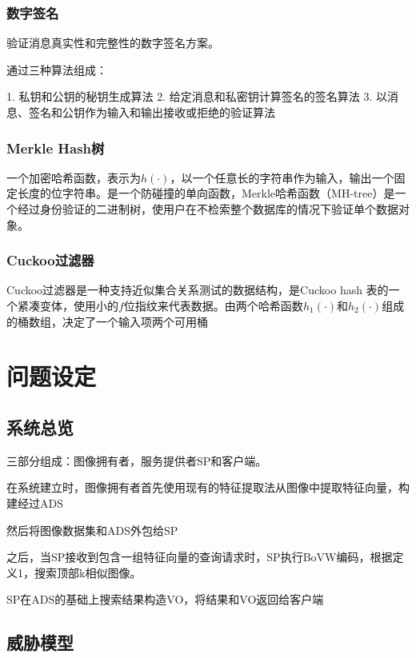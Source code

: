 \documentclass{article}
\begin{document}
\subsubsection{数字签名}

验证消息真实性和完整性的数字签名方案。

通过三种算法组成：

1. 私钥和公钥的秘钥生成算法
2. 给定消息和私密钥计算签名的签名算法
3. 以消息、签名和公钥作为输入和输出接收或拒绝的验证算法


\subsubsection{Merkle Hash树}

一个加密哈希函数，表示为$h(\cdot)$，以一个任意长的字符串作为输入，输出一个固定长度的位字符串。是一个防碰撞的单向函数，Merkle哈希函数（MH-tree）是一个经过身份验证的二进制树，使用户在不检索整个数据库的情况下验证单个数据对象。

\subsubsection{Cuckoo过滤器}

Cuckoo过滤器是一种支持近似集合关系测试的数据结构，是Cuckoo hash 表的一个紧凑变体，使用小的$f$位指纹来代表数据。由两个哈希函数$h_1(\cdot)$和$h_2(\cdot)$组成的桶数组，决定了一个输入项两个可用桶

\section{问题设定}


\subsection{系统总览}

三部分组成：图像拥有者，服务提供者SP和客户端。

在系统建立时，图像拥有者首先使用现有的特征提取法从图像中提取特征向量，构建经过ADS

然后将图像数据集和ADS外包给SP

之后，当SP接收到包含一组特征向量的查询请求时，SP执行BoVW编码，根据定义1，搜索顶部k相似图像。

SP在ADS的基础上搜索结果构造VO，将结果和VO返回给客户端

\subsection{威胁模型}
\end{document}
